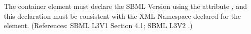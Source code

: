 The  container element must declare the SBML Version
using the attribute , and this declaration must be
consistent with the XML Namespace declared for the 
element.  (References: 
SBML L3V1 Section 4.1; SBML L3V2 .)
